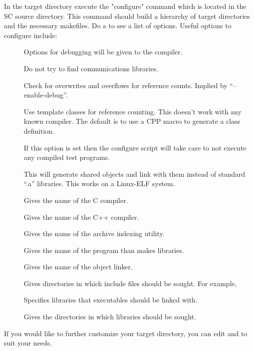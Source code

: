  In the target directory execute the "configure" command which is located
in the SC source directory. This command should build a hierarchy of
target directories and the necessary makefiles. Do a  to see a list of options.  Useful options to configure
include:

\begin{description}
\item[] Options for debugging will be given to
the compiler.
\item[] Do not try to find communications
libraries.
\item[] Check for overwrites and overflows
for reference counts.  Implied by ``--enable-debug''.
\item[] Use template classes for reference
counting.  This doesn't work with any known compiler.  The default is to
use a CPP macro to generate a class definition.
\item[] If this option is set then the
configure script will take care to not execute any compiled test programs.
\item[] This will generate shared objects and
link with them instead of standard ``.a'' libraries.  This works on a
Linux-ELF system.
\item[] Gives the name of the C compiler.
\item[] Gives the name of the C++ compiler.
\item[] Gives the name of the archive indexing utility.
\item[] Gives the name of the program than makes libraries.
\item[] Gives the name of the object linker.
\item[] Gives directories in which include files
should be sought.  For example, 
\item[] Specifies libraries that executables should be
linked with.
\item[] Gives the directories in which libraries
should be sought.
\end{description}

  If you would like to further customize your target directory,
you can edit  and  to
suit your needs.

